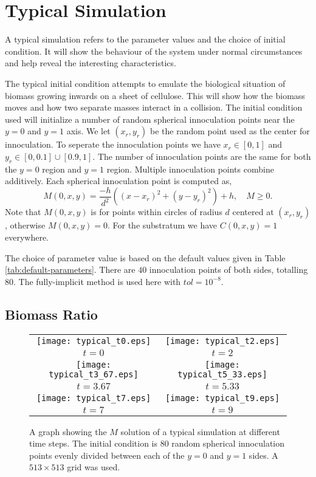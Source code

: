 \section{Typical Simulation}

A typical simulation refers to the parameter values and the choice of initial condition.
It will show the behaviour of the system under normal circumstances and help reveal the interesting characteristics.

The typical initial condition attempts to emulate the biological situation of biomass growing inwards on a sheet of cellulose.
This will show how the biomass moves and how two separate masses interact in a collision.
The initial condition used will initialize a number of random spherical innoculation points near the $y=0$ and $y=1$ axis.
We let $(x_r, y_r)$ be the random point used as the center for innoculation.
To seperate the innoculation points we have $x_r \in [0,1]$ and $y_r \in [0, 0.1] \cup [0.9, 1]$.
The number of innoculation points are the same for both the $y=0$ region and $y=1$ region.
Multiple innoculation points combine additively.
Each spherical innoculation point is computed as,
\begin{equation} \label{equ:typical_initial_cond}
  M(0,x,y) = \frac{-h}{d^2} \left( (x-x_r)^2 + (y - y_r)^2 \right) + h, \quad M \ge 0.
\end{equation}
Note that $M(0,x,y)$ is for points within circles of radius $d$ centered at $(x_r, y_r)$, otherwise $M(0,x,y) = 0$.
For the substratum we have $C(0,x,y) = 1$ everywhere.

The choice of parameter value is based on the default values given in Table \ref{tab:default-parameters}.
There are $40$ innoculation points of both sides, totalling $80$.
The fully-implicit method is used here with $tol = 10^{-8}$.

\subsection{Biomass Ratio}

\begin{figure}[h!tb]
  \centering
  \begin{tabular}{c c}
      \texttt{[image: typical\_t0.eps]} &
      \texttt{[image: typical\_t2.eps]} \\
      $t = 0$ & $t = 2$ \\
      \texttt{[image: typical\_t3\_67.eps]} &
      \texttt{[image: typical\_t5\_33.eps]} \\
      $t = 3.67$ & $t = 5.33$ \\
      \texttt{[image: typical\_t7.eps]} &
      \texttt{[image: typical\_t9.eps]} \\
      $t = 7$ & $t = 9$
   \end{tabular}
  \caption{A graph showing the $M$ solution of a typical simulation at different time steps.
    The initial condition is $80$ random spherical innoculation points evenly divided between each of the $y=0$ and $y=1$ sides.
    A $513 \times 513$ grid was used.  }
  \label{fig:typical_sim}
\end{figure}

